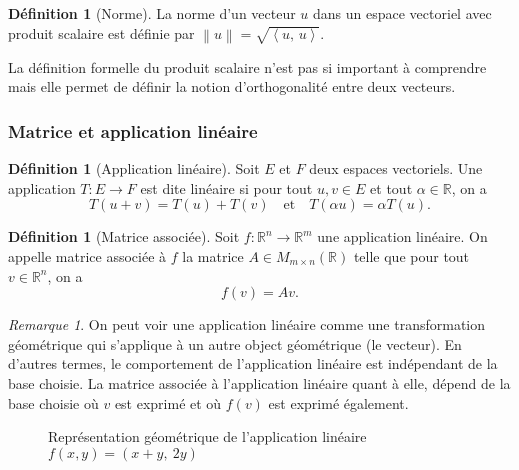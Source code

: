 \documentclass[11pt,a4paper]{article}
\numberwithin{equation}{section}
\theoremstyle{plain}
\theoremstyle{definition}
\newtheorem{definition}[theorem]{Définition}
\theoremstyle{remark}
\newtheorem*{remark}{Remarque}
\newcommand{\R}{\mathbb{R}}
\newcommand{\norm}[1]{\left\lVert #1\right\rVert}
\newcommand{\ip}[2]{\left\langle #1,\, #2\right\rangle}
\begin{document}
\begin{definition}[Norme]
    La norme d'un vecteur \(u\) dans un espace vectoriel avec produit scalaire est définie par \(\norm{u} = \sqrt{\ip{u}{u}}\).
\end{definition}

La définition formelle du produit scalaire n'est pas si important à comprendre mais elle permet de définir la notion d'orthogonalité entre deux vecteurs.

\subsubsection{Matrice et application linéaire}

\begin{definition}[Application linéaire]
Soit $E$ et $F$ deux espaces vectoriels. Une application $T : E \to F$ est dite linéaire si pour tout $u,v \in E$ et tout \(\alpha \in \R\), on a
\[
    T(u+v) = T(u) + T(v) \quad \text{et} \quad T(\alpha u) = \alpha T(u).
\]
\end{definition}

\begin{definition}[Matrice associée]
Soit $f : \R^n \to \R^m$ une application linéaire. On appelle matrice associée à $f$ la matrice $A \in M_{m \times n}(\R)$ telle que pour tout $v \in \R^n$, on a
\[
    f(v) = Av.
\]
\end{definition}

\begin{remark}
    On peut voir une application linéaire comme une transformation géométrique qui s'applique à un autre object géométrique (le vecteur).
    En d'autres termes, le comportement de l'application linéaire est indépendant de la base choisie.
    La matrice associée à l'application linéaire quant à elle, dépend de la base choisie où $v$ est exprimé et où $f(v)$ est exprimé également.
\end{remark}

\begin{figure}
    \centering
    \caption{Représentation géométrique de l'application linéaire $f(x,y) = (x + y, \ 2y)$}
\end{figure}
\end{document}
